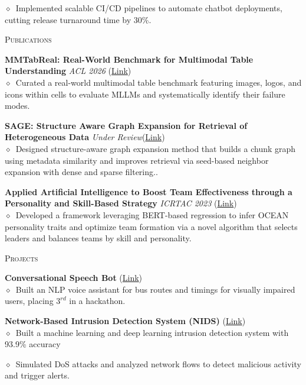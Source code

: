 \documentclass[11pt, a4paper]{article}
\newcommand{\smaller}[1]{{\small$\diamond$\ #1}}
\newcommand{\headright}[1]{\vspace*{0.5ex}\textsc{\Large\color{cvblue}#1}\par%
     \vspace*{-2ex}{\color{cvblue}\hrulefill}\par}
\begin{document}
\begin{minipage}[t]{0.56\textwidth}
\smaller{Implemented scalable CI/CD pipelines to automate chatbot deployments, cutting release turnaround time by 30\%.}





\headright{Publications}

\textbf{MMTabReal: Real-World Benchmark for Multimodal Table Understanding} \textit{ACL 2026} \hfill (\href{https://arxiv.org/pdf/2505.21771}{Link}) \\
\smaller{Curated a real-world multimodal table benchmark featuring images, logos, and icons within cells to evaluate MLLMs and systematically identify their failure modes.} 

\textbf{SAGE: Structure Aware Graph Expansion for Retrieval of Heterogeneous
Data} \textit{Under Review}\hfill (\href{https://arxiv.org/pdf/2602.16964}{Link}) \\
\smaller{Designed structure-aware graph expansion method that builds a chunk graph using metadata similarity and improves retrieval via seed-based neighbor expansion with dense and sparse filtering..} 

\textbf{Applied Artificial Intelligence to Boost Team Effectiveness through a Personality and Skill-Based Strategy} \textit{ICRTAC 2023} \hfill (\href{https://ieeexplore.ieee.org/document/10480783}{Link}) \\
\smaller{Developed a framework leveraging BERT-based regression to infer OCEAN personality traits and optimize team formation via a novel algorithm that selects leaders and balances teams by skill and personality.} 


\headright{Projects}

\textbf{Conversational Speech Bot} \hfill(\href{https://github.com/prasham1515/Conversational-Speech-bot}{Link}) \\
\smaller{Built an NLP voice assistant for bus routes and timings for visually impaired users, placing $3^{rd}$ in a hackathon.} 

\textbf{Network-Based Intrusion Detection System (NIDS)} \hfill(\href{https://github.com/prasham1515/Conversational-Speech-bot}{Link}) \\
\smaller{Built a machine learning and deep learning intrusion detection system with 93.9\% accuracy}
\vspace{-0.3em}

\smaller{Simulated DoS attacks and analyzed network flows to detect malicious activity and trigger alerts.} 



\end{minipage}
\end{document}
